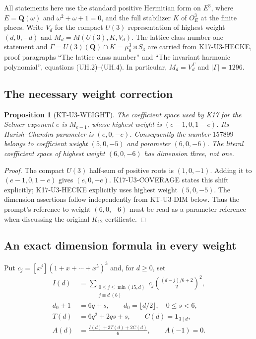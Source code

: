 \documentclass[11pt,a4paper]{article}
\newtheorem{proposition}[theorem]{Proposition}
\theoremstyle{definition}
\begin{document}
All statements here use the standard positive Hermitian form on
$E^3$, where $E=\mathbf Q(\omega)$ and $\omega^2+\omega+1=0$,
and the full stabilizer $K$ of $O_E^3$ at the finite places.
Write $V_d$ for the compact $U(3)$ representation of highest weight
$(d,0,-d)$ and $M_d=M(U(3),K,V_d)$.
The lattice class-number-one statement and
$\Gamma=U(3)(\mathbf Q)\cap K=\mu_6^3\rtimes S_3$ are carried
from K17-U3-HECKE, proof paragraphs ``The lattice class number'' and
``The invariant harmonic polynomial'', equations (UH.2)--(UH.4).
In particular, $M_d=V_d^\Gamma$ and $|\Gamma|=1296$.

\subsection{The necessary weight correction}
\begin{proposition}[KT-U3-WEIGHT]
The coefficient space used by K17 for the Selmer exponent $e$ is
$M_{e-1}$, whose highest weight is $(e-1,0,1-e)$.
Its Harish--Chandra parameter is $(e,0,-e)$.
Consequently the number $157899$ belongs to coefficient weight
$(5,0,-5)$ and parameter $(6,0,-6)$.
The literal coefficient space of highest weight $(6,0,-6)$ has
dimension three, not one.
\end{proposition}
\begin{proof}
The compact $U(3)$ half-sum of positive roots is $(1,0,-1)$.
Adding it to $(e-1,0,1-e)$ gives $(e,0,-e)$.
K17-U3-COVERAGE states this shift explicitly; K17-U3-HECKE
explicitly uses highest weight $(5,0,-5)$.
The dimension assertions follow independently from
KT-U3-DIM below. Thus the prompt's reference to weight $(6,0,-6)$
must be read as a parameter reference when discussing the original
$K_{12}$ certificate.
\end{proof}

\subsection{An exact dimension formula in every weight}

Put $c_j=[x^j](1+x+\cdots+x^5)^3$ and, for $d\geq0$, set
\begin{align*}
 I(d)&=\sum_{\substack{0\leq j\leq\min(15,d)\\j\equiv d\ (6)}}
      c_j\binom{(d-j)/6+2}{2}^{\!2},\\
 d_0+1&=6q+s,\qquad d_0=\lfloor d/2\rfloor,\quad0\leq s<6,\\
 T(d)&=6q^2+2qs+s,\qquad C(d)=\mathbf1_{3\mid d},\\
 A(d)&=\frac{I(d)+3T(d)+2C(d)}6,
 \qquad A(-1)=0.
\end{align*}
\end{document}
